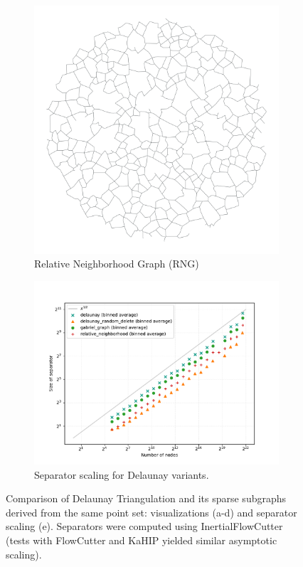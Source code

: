 \begin{figure}[tbhp]
	\begin{subfigure}{0.3\linewidth}
		\centering
		\includegraphics[width=\linewidth]{graphics/relative_neighborhood.png}
		\caption{Relative Neighborhood Graph (RNG)}
		\label{fig:delaunay_rng_viz}
	\end{subfigure}
	\hfill
	\begin{subfigure}{0.6\linewidth}
		\centering
		\includegraphics[width=\linewidth]{graphics/delaunay_variants_sep.pdf}
		\caption{Separator scaling for Delaunay variants.}
		\label{fig:delaunay_variants_sep_plot}
	\end{subfigure}
	\caption{Comparison of Delaunay Triangulation and its sparse subgraphs derived from the same point set: visualizations (a-d) and separator scaling (e). Separators were computed using InertialFlowCutter (tests with FlowCutter and KaHIP yielded similar asymptotic scaling).}
	\label{fig:delaunay_variants_comparison}
\end{figure}

